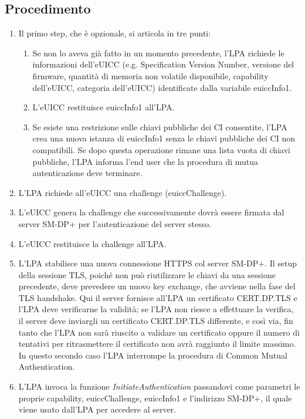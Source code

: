 \documentclass[10pt, twoside, openany]{book}
\begin{document}
\subsection{Procedimento}
\begin{enumerate}
\item Il primo step, che è opzionale, si articola in tre punti:
\begin{enumerate}[label=\alph*)]
\item Se non lo aveva già fatto in un momento precedente, l'LPA richiede le informazioni dell'eUICC (e.g. Specification Version Number, versione del firmware, quantità di memoria non volatile disponibile, capability dell'eUICC, categoria dell'eUICC) identificate dalla variabile euiccInfo1.
\item L'eUICC restituisce euiccInfo1 all'LPA.
\item Se esiste una restrizione sulle chiavi pubbliche dei CI consentite, l'LPA crea una nuova istanza di euiccInfo1 senza le chiavi pubbliche dei CI non compatibili. Se dopo questa operazione rimane una lista vuota di chiavi pubbliche, l'LPA informa l'end user che la procedura di mutua autenticazione deve terminare.
\end{enumerate}
\item L'LPA richiede all'eUICC una challenge (euiccChallenge).
\item L'eUICC genera la challenge che successivamente dovrà essere firmata dal server SM-DP+ per l'autenticazione del server stesso.
\item L'eUICC restituisce la challenge all'LPA.
\item L'LPA stabilisce una nuova connessione HTTPS col server SM-DP+. Il setup della sessione TLS, poiché non può riutilizzare le chiavi da una sessione precedente, deve prevedere un nuovo key exchange, che avviene nella fase del TLS handshake. Qui il server fornisce all'LPA un certificato CERT.DP.TLS e l'LPA deve verificarne la validità; se l'LPA non riesce a effettuare la verifica, il server deve inviargli un certificato CERT.DP.TLS differente, e così via, fin tanto che l'LPA non sarà riuscito a validare un certificato oppure il numero di tentativi per ritrasmettere il certificato non avrà raggiunto il limite massimo. In questo secondo caso l'LPA interrompe la procedura di Common Mutual Authentication.
\item L'LPA invoca la funzione \textit{InitiateAuthentication} passandovi come parametri le proprie capability, euiccChallenge, euiccInfo1 e l'indirizzo SM-DP+, il quale viene usato dall'LPA per accedere al server.

\end{enumerate}
\end{document}
